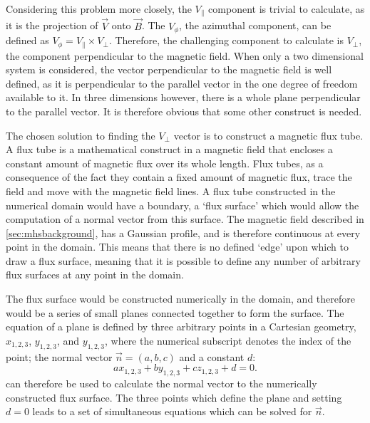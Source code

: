 Considering this problem more closely, the $V_\parallel$ component is trivial to calculate, as it is the projection of $\vec{V}$ onto $\vec{B}$.
The $V_\phi$, the azimuthal component, can be defined as $V_\phi = V_\parallel \times V_\perp$.
Therefore, the challenging component to calculate is $V_\perp$, the component perpendicular to the magnetic field.
When only a two dimensional system is considered, the vector perpendicular to the magnetic field is well defined, as it is perpendicular to the parallel vector in the one degree of freedom available to it.
In three dimensions however, there is a whole plane perpendicular to the parallel vector.
It is therefore obvious that some other construct is needed.

The chosen solution to finding the $V_\perp$ vector is to construct a magnetic flux tube.
A flux tube is a mathematical construct in a magnetic field that encloses a constant amount of magnetic flux over its whole length.
Flux tubes, as a consequence of the fact they contain a fixed amount of magnetic flux, trace the field and move with the magnetic field lines.
A flux tube constructed in the numerical domain would have a boundary, a `flux surface' which would allow the computation of a normal vector from this surface.
The magnetic field described in \cref{sec:mhsbackground}, has a Gaussian profile, and is therefore continuous at every point in the domain.
This means that there is no defined `edge' upon which to draw a flux surface, meaning that it is possible to define any number of arbitrary flux surfaces at any point in the domain.



The flux surface would be constructed numerically in the domain, and therefore would be a series of small planes connected together to form the surface.
The equation of a plane is defined by three arbitrary points in a Cartesian geometry, $x_{1,2,3}$, $y_{1,2,3}$, and $y_{1,2,3}$, where the numerical subscript denotes the index of the point; the normal vector $\vec{n}=(a,b,c)$ and a constant $d$:
\begin{equation}
	ax_{1,2,3}+by_{1,2,3}+cz_{1,2,3}+d=0.
    \label{eq:plane}
\end{equation}
 can therefore be used to calculate the normal vector to the numerically constructed flux surface.
The three points which define the plane and setting $d=0$ leads to a set of simultaneous equations which can be solved for $\vec{n}$.

